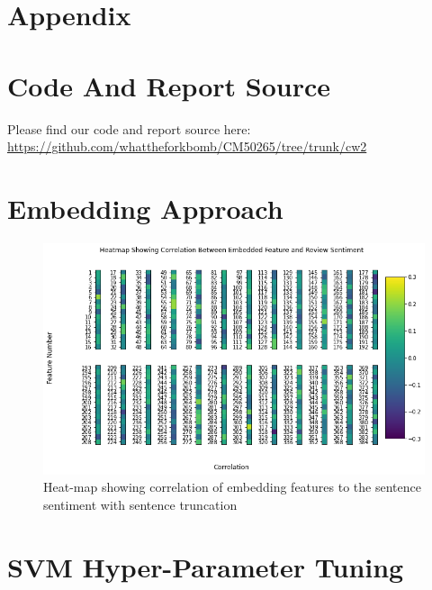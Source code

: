\section*{\Large Appendix}
\appendix

\section{Code And Report Source}\label{app:src}
Please find our code and report source here: \url{https://github.com/whattheforkbomb/CM50265/tree/trunk/cw2}
\newpage

\section{Embedding Approach}
\begin{figure}[h!]
    \centering
    \includegraphics[width=\textwidth]{figures/Feature_Correlation_Heatmap.png}
    \caption{\label{fig:feature_corr_hm_old} Heat-map showing correlation of embedding features to the sentence sentiment with sentence truncation}
\end{figure}
\newpage

\section{SVM Hyper-Parameter Tuning}

